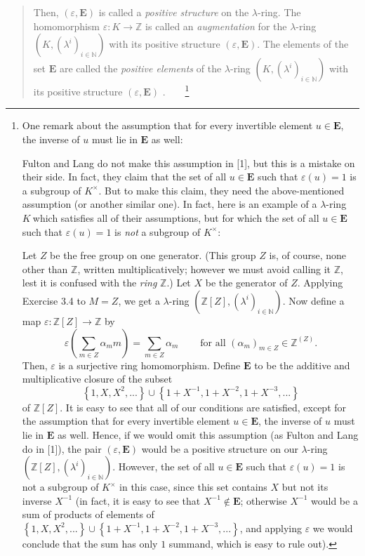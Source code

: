 \documentclass[numbers=enddot,12pt,final,onecolumn,notitlepage]{scrartcl}%
\begin{document}
\begin{quote}
Then, $\left(  \varepsilon,\mathbf{E}\right)  $ is called a \textit{positive
structure} on the $\lambda$-ring. The homomorphism $\varepsilon:K\rightarrow
\mathbb{Z}$ is called an \textit{augmentation} for the $\lambda$-ring $\left(
K,\left(  \lambda^{i}\right)  _{i\in\mathbb{N}}\right)  $ with its positive
structure $\left(  \varepsilon,\mathbf{E}\right)  $. The elements of the set
$\mathbf{E}$ are called the \textit{positive elements} of the $\lambda$-ring
$\left(  K,\left(  \lambda^{i}\right)  _{i\in\mathbb{N}}\right)  $ with its
positive structure $\left(  \varepsilon,\mathbf{E}\right)  $%
.\ \ \ \ \footnote{One remark about the assumption that for every invertible
element $u\in\mathbf{E}$, the inverse of $u$ must lie in $\mathbf{E}$ as well:
\par
Fulton and Lang do not make this assumption in [1], but this is a mistake on
their side. In fact, they claim that the set of all $u\in\mathbf{E}$ such that
$\varepsilon\left(  u\right)  =1$ is a subgroup of $K^{\times}$. But to make
this claim, they need the above-mentioned assumption (or another similar one).
In fact, here is an example of a $\lambda$-ring $K\ $which satisfies all of
their assumptions, but for which the set of all $u\in\mathbf{E}$ such that
$\varepsilon\left(  u\right)  =1$ is \textit{not} a subgroup of $K^{\times}$:
\par
Let $Z$ be the free group on one generator. (This group $Z$ is, of course,
none other than $\mathbb{Z}$, written multiplicatively; however we must avoid
calling it $\mathbb{Z}$, lest it is confused with the \textit{ring}
$\mathbb{Z}$.) Let $X$ be the generator of $Z$. Applying Exercise 3.4 to
$M=Z$, we get a $\lambda$-ring $\left(  \mathbb{Z}\left[  Z\right]  ,\left(
\lambda^{i}\right)  _{i\in\mathbb{N}}\right)  $. Now define a map
$\varepsilon:\mathbb{Z}\left[  Z\right]  \rightarrow\mathbb{Z}$ by%
\[
\varepsilon\left(  \sum_{m\in Z}\alpha_{m}m\right)  =\sum_{m\in Z}\alpha
_{m}\ \ \ \ \ \ \ \ \ \ \text{for all }\left(  \alpha_{m}\right)  _{m\in Z}%
\in\mathbb{Z}^{\left(  Z\right)  }.
\]
Then, $\varepsilon$ is a surjective ring homomorphism. Define $\mathbf{E}$ to
be the additive and multiplicative closure of the subset%
\[
\left\{  1,X,X^{2},...\right\}  \cup\left\{  1+X^{-1},1+X^{-2},1+X^{-3}%
,...\right\}
\]
of $\mathbb{Z}\left[  Z\right]  $. It is easy to see that all of our
conditions are satisfied, except for the assumption that for every invertible
element $u\in\mathbf{E}$, the inverse of $u$ must lie in $\mathbf{E}$ as well.
Hence, if we would omit this assumption (as Fulton and Lang do in [1]), the
pair $\left(  \varepsilon,\mathbf{E}\right)  $ would be a positive structure
on our $\lambda$-ring $\left(  \mathbb{Z}\left[  Z\right]  ,\left(
\lambda^{i}\right)  _{i\in\mathbb{N}}\right)  $. However, the set of all
$u\in\mathbf{E}$ such that $\varepsilon\left(  u\right)  =1$ is not a subgroup
of $K^{\times}$ in this case, since this set contains $X$ but not its inverse
$X^{-1}$ (in fact, it is easy to see that $X^{-1}\notin\mathbf{E}$; otherwise
$X^{-1}$ would be a sum of products of elements of $\left\{  1,X,X^{2}%
,...\right\}  \cup\left\{  1+X^{-1},1+X^{-2},1+X^{-3},...\right\}  $, and
applying $\varepsilon$ we would conclude that the sum has only $1$ summand,
which is easy to rule out).}


\end{quote}
\end{document}
